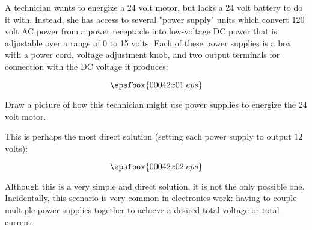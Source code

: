 

A technician wants to energize a 24 volt motor, but lacks a 24 volt battery to do it with.  Instead, she has access to several "power supply" units which convert 120 volt AC power from a power receptacle into low-voltage DC power that is adjustable over a range of 0 to 15 volts.  Each of these power supplies is a box with a power cord, voltage adjustment knob, and two output terminals for connection with the DC voltage it produces:

$$\epsfbox{00042x01.eps}$$ 

Draw a picture of how this technician might use power supplies to energize the 24 volt motor.







This is perhaps the most direct solution (setting each power supply to output 12 volts):

$$\epsfbox{00042x02.eps}$$ 







Although this is a very simple and direct solution, it is not the only possible one.  Incidentally, this scenario is very common in electronics work: having to couple multiple power supplies together to achieve a desired total voltage or total current.




